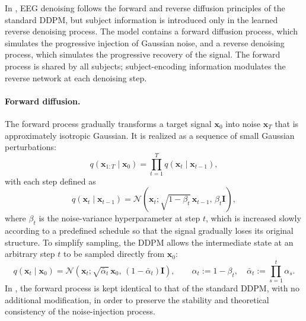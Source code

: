 In \saddpm{}, EEG denoising follows the forward and reverse diffusion principles of the standard DDPM, but subject information is introduced only in the learned reverse denoising process. The model contains a forward diffusion process, which
simulates the progressive injection of Gaussian noise, and a reverse denoising process, which simulates the progressive recovery of the signal. The forward process is shared by all subjects; subject-encoding information modulates the
reverse network at each denoising step.

\paragraph{Forward diffusion.}
The forward process gradually transforms a target signal $\mathbf{x}_0$ into noise $\mathbf{x}_T$ that is approximately isotropic Gaussian. It is realized as a sequence of small Gaussian perturbations:
\begin{equation}
  q(\mathbf{x}_{1:T}\mid \mathbf{x}_0)=\prod_{t=1}^{T}q(\mathbf{x}_t\mid \mathbf{x}_{t-1}),
  \label{eq:forward_chain}
\end{equation}
with each step defined as
\begin{equation}
  q(\mathbf{x}_t\mid \mathbf{x}_{t-1})=\mathcal{N}\!\left(\mathbf{x}_t;\sqrt{1-\beta_t}\,\mathbf{x}_{t-1},\,\beta_t\mathbf{I}\right),
  \label{eq:forward_step}
\end{equation}
where $\beta_t$ is the noise-variance hyperparameter at step $t$, which is increased slowly according to a predefined schedule so that the signal gradually loses its original structure. To simplify sampling, the DDPM allows the intermediate state at an arbitrary step $t$ to be sampled directly from
$\mathbf{x}_0$:
\begin{equation}
  q(\mathbf{x}_t\mid \mathbf{x}_0)=\mathcal{N}\!\left(\mathbf{x}_t;\sqrt{\bar{\alpha}_t}\,\mathbf{x}_0,\,(1-\bar{\alpha}_t)\mathbf{I}\right),
  \qquad
  \alpha_t:=1-\beta_t,\quad\bar{\alpha}_t:=\prod_{s=1}^{t}\alpha_s.
  \label{eq:forward_marginal}
\end{equation}
In \saddpm{}, the forward process is kept identical to that of the standard DDPM, with no additional modification, in order to preserve the stability and
theoretical consistency of the noise-injection process.

